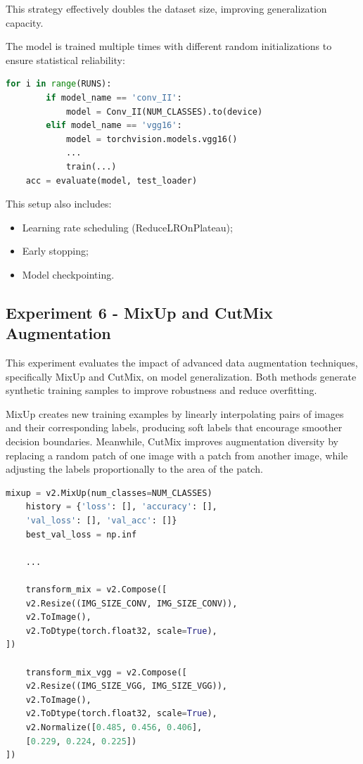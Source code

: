 \documentclass[conference,a4paper]{IEEEtran}
\begin{document}
This strategy effectively doubles the dataset size, improving generalization capacity.

The model is trained multiple times with different random initializations to ensure statistical reliability:

\begin{lstlisting}[language=Python]
for i in range(RUNS):
        if model_name == 'conv_II':
            model = Conv_II(NUM_CLASSES).to(device)
        elif model_name == 'vgg16':
            model = torchvision.models.vgg16()
            ...
            train(...)
    acc = evaluate(model, test_loader)
\end{lstlisting}

This setup also includes:
\begin{itemize}
    \item Learning rate scheduling (ReduceLROnPlateau);
    \item Early stopping;
    \item Model checkpointing.
\end{itemize}

\subsection{Experiment 6 - MixUp and CutMix Augmentation}

This experiment evaluates the impact of advanced data augmentation techniques, specifically MixUp and CutMix, on model generalization. Both methods generate synthetic training samples to improve robustness and reduce overfitting.

MixUp creates new training examples by linearly interpolating pairs of images and their corresponding labels, producing soft labels that encourage smoother decision boundaries. Meanwhile, CutMix improves augmentation diversity by replacing a random patch of one image with a patch from another image, while adjusting the labels proportionally to the area of the patch.

\begin{lstlisting}[language=Python]
    mixup = v2.MixUp(num_classes=NUM_CLASSES)
    history = {'loss': [], 'accuracy': [],
    'val_loss': [], 'val_acc': []}
    best_val_loss = np.inf

    ...

    transform_mix = v2.Compose([
    v2.Resize((IMG_SIZE_CONV, IMG_SIZE_CONV)),
    v2.ToImage(),
    v2.ToDtype(torch.float32, scale=True),
])

    transform_mix_vgg = v2.Compose([
    v2.Resize((IMG_SIZE_VGG, IMG_SIZE_VGG)),
    v2.ToImage(),
    v2.ToDtype(torch.float32, scale=True),
    v2.Normalize([0.485, 0.456, 0.406],
    [0.229, 0.224, 0.225])
])

\end{lstlisting}
\end{document}
